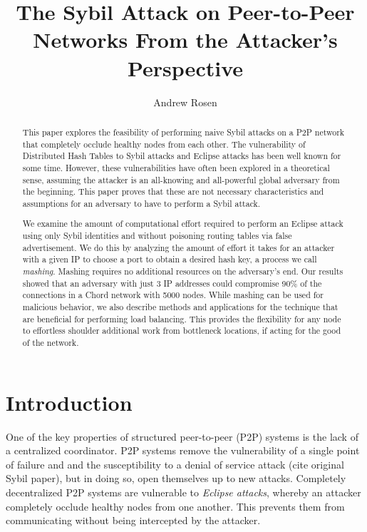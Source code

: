 \documentclass[a4paper]{article}
\author{Andrew Rosen}
\title{The Sybil Attack on Peer-to-Peer Networks From the Attacker's Perspective}   %
\begin{document}
\maketitle



\begin{abstract}
This paper explores the feasibility of performing naive Sybil attacks on a P2P network that completely occlude healthy nodes from each other.
The vulnerability of Distributed Hash Tables to Sybil attacks and Eclipse attacks has been well known for some time.
However, these vulnerabilities have often been explored in a theoretical sense, assuming the attacker is an all-knowing  and all-powerful global adversary from the beginning.
This paper proves that these are not necessary characteristics and assumptions for an adversary to have to perform a Sybil attack.


We examine the amount of computational effort required to perform an Eclipse attack using only Sybil identities and without poisoning routing tables via false advertisement.
We do this by analyzing the amount of effort it takes for an attacker with a given IP to choose a port to obtain a desired hash key, a process we call \emph{mashing}.
Mashing requires no additional resources on the adversary's end.
Our results showed that an adversary with just 3 IP addresses could compromise 90\% of the connections in a Chord network with 5000 nodes.
While mashing can be used for malicious behavior, we also describe methods and applications for the technique that are beneficial for performing load balancing.
This provides the flexibility for any node to effortless shoulder additional work from bottleneck locations, if acting for the good of the network.
\end{abstract}

\section{Introduction}
One of the key properties of structured peer-to-peer (P2P) systems is the lack of a centralized coordinator.
P2P systems remove the vulnerability of a single point of failure and and the susceptibility to a denial of service attack (cite original Sybil paper), but in doing so, open themselves up to new attacks.
Completely decentralized P2P systems are vulnerable to \textit{Eclipse attacks}, whereby an attacker completely occlude healthy nodes from one another.
This prevents them from communicating without being intercepted by the attacker.
\end{document}
